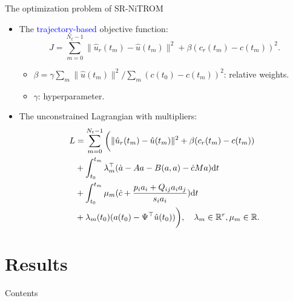 \documentclass[presentation]{beamer}
\begin{document}
\begin{frame}[label={sec:org7d0e97e}]{The optimization problem of SR-NiTROM}
\begin{itemize}[<+->]
\item The \textcolor{blue}{trajectory-based} objective function:
\begin{equation}
  \label{eq:4}
  J = \sum_{m = 0}^{N_{t} - 1}\|\hat{u}_{r}(t_{m}) - \hat{u}(t_{m})\|^{2} + \beta(c_{r}(t_{m}) - c(t_{m}))^{2}.
\end{equation}
\begin{itemize}
\item \(\beta = \gamma\sum_{m}\|\hat{u}(t_{m})\|^{2}/\sum_{m}(c(t_{0}) - c(t_{m}))^{2}\): relative weights.
\item \(\gamma\): hyperparameter.
\end{itemize}
\item The unconstrained Lagrangian with multipliers:
\begin{align}
  \label{eq:5}
  L &= \sum_{m = 0}^{N_{t} - 1}\bigg(\|\hat{u}_{r}(t_{m}) - \hat{u}(t_{m})\|^{2} + \beta(c_{r}(t_{m}) - c(t_{m}))\notag\\
    &+ \int_{t_{0}}^{t_{m}}\lambda_{m}^{\top}(\dot{a} - Aa - B(a,a) - \dot{c}Ma)\mathrm{d}t\\
    &+ \int_{t_{0}}^{t_{m}}\mu_{m}(\dot{c} + \frac{p_{i}a_{i} + Q_{ij}a_{i}a_{j}}{s_{i}a_{i}})\mathrm{d}t\\
    &+ \lambda_{m}(t_{0})(a(t_{0}) - \Psi^{\top}\hat{u}(t_{0}))\bigg), \quad \lambda_{m}\in\mathbb{R}^{r}, \mu_{m}\in\mathbb{R}.
\end{align}
\end{itemize}
\end{frame}

\section{Results}
\label{sec:org88a3cc1}
\begin{frame}{Contents}
\end{frame}
\end{document}
